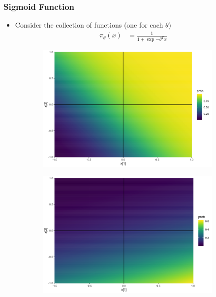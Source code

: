 \documentclass[10pt,mathserif]{beamer}
\begin{document}
\begin{frame}
  \frametitle{Sigmoid Function}
  \begin{itemize}
  \item Consider the collection of functions (one for each $\theta$)
    \begin{align*}
      \pi_{\theta}\left(x\right) &= \frac{1}{1 + \exp{-\theta^{T}x}}
    \end{align*}
  \end{itemize}
  \begin{figure}
    \begin{subfigure}{.1\textwidth}
      \centering
      \includegraphics[width=0.1\paperwidth]{figure/sigmoid_plot_1}
    \end{subfigure}
    \begin{subfigure}{.1\textwidth}
      \centering
      \includegraphics[width=0.1\paperwidth]{figure/sigmoid_plot_2}

\end{subfigure}
\end{figure}
\end{frame}
\end{document}
